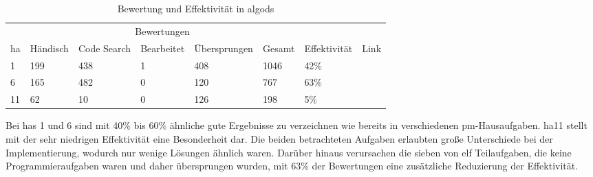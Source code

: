 \renewcommand{\thefootnote}{\alph{footnote}}
\begin{table}
    \centering
    \caption{Bewertung und Effektivität in \ac{algods}}
    \begin{tabular}{|l|l|l|l|l|l|l|l|}
    \hline
        ~ & \multicolumn{5}{c|}{Bewertungen} & ~ & ~ \\
        \acs{ha} & Händisch & Code Search & Bearbeitet & Übersprungen & Gesamt & Effektivität & Link \\ \hline
        1  & 199 & 438 & 1 & 408 & 1046 & 42\% & \footnotemark[1] \\ \hline
        6  & 165 & 482 & 0 & 120 &  767 & 63\% & \footnotemark[2] \\ \hline
        11 &  62 &  10 & 0 & 126 &  198 & 5\% & \footnotemark[3] \\ \hline
    \end{tabular}
    \label{tbl:algods-effectiveness}
\end{table}

\renewcommand{\thefootnote}{\arabic{footnote}}

Bei \acp{ha} 1 und 6 sind mit 40\% bis 60\% ähnliche gute Ergebnisse zu verzeichnen wie bereits in verschiedenen \ac{pm}-Hausaufgaben.
\ac{ha}11 stellt mit der sehr niedrigen Effektivität eine Besonderheit dar.
Die beiden betrachteten Aufgaben erlaubten große Unterschiede bei der Implementierung, wodurch nur wenige Lösungen ähnlich waren.
Darüber hinaus verursachen die sieben von elf Teilaufgaben, die keine Programmieraufgaben waren und daher übersprungen wurden, mit 63\% der Bewertungen eine zusätzliche Reduzierung der Effektivität.
